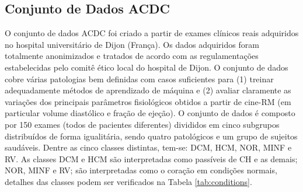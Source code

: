 \subsection{Conjunto de Dados ACDC} 
\label{subsec:cap5_acdc}

O conjunto de dados \gls{ACDC} foi criado a partir de exames clínicos reais adquiridos no hospital universitário de Dijon (França). Os dados adquiridos foram totalmente anonimizados e tratados de acordo com as regulamentações estabelecidas pelo comitê ético local do hospital de Dijon. O conjunto de dados cobre várias patologias bem definidas com casos suficientes para (1) treinar adequadamente métodos de aprendizado de máquina e (2) avaliar claramente as variações dos principais parâmetros fisiológicos obtidos a partir de cine-RM (em particular volume diastólico e fração de ejeção). O conjunto de dados é composto por 150 exames (todos de pacientes diferentes) divididos em cinco subgrupos distribuídos de forma igualitária, sendo quatro patológicos e um grupo de sujeitos saudáveis. Dentre as cinco classes distintas, tem-se: \gls{DCM}, \gls{HCM}, \gls{NOR}, \gls{MINF} e \gls{RV}. As classes DCM e HCM são interpretadas como passíveis de \gls{CH} e as demais; NOR, MINF e RV; são interpretadas como o coração em condições normais, detalhes das classes podem ser verificados na Tabela \ref{tab:conditions}. 

